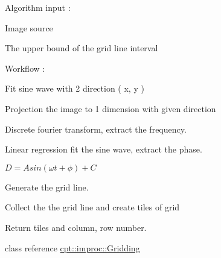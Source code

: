 Algorithm input \-:


\begin{DoxyItemize}
\item Image source
\item The upper bound of the grid line interval
\end{DoxyItemize}

Workflow \-:


\begin{DoxyEnumerate}
\item Fit sine wave with 2 direction ( x, y )
\begin{DoxyEnumerate}
\item Projection the image to 1 dimension with given direction
\item Discrete fourier transform, extract the frequency.
\item Linear regression fit the sine wave, extract the phase.\par
 $ D = A sin( \omega t + \phi ) + C $
\item Generate the grid line.
\end{DoxyEnumerate}
\item Collect the the grid line and create tiles of grid
\item Return tiles and column, row number.
\end{DoxyEnumerate}

class reference \hyperlink{structcpt_1_1improc_1_1_gridding}{cpt\-::improc\-::\-Gridding} 